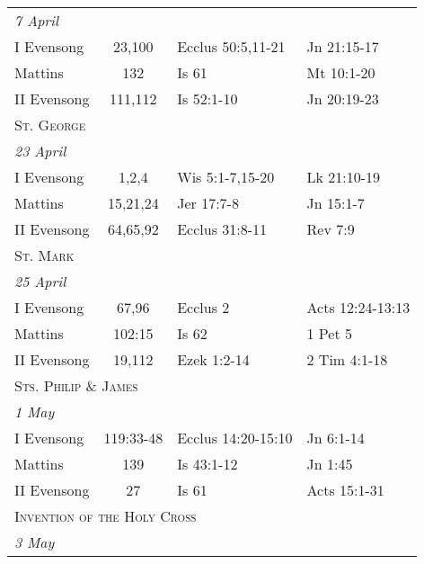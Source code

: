 \begin{longtable}{l c l l}
\multicolumn{4}{l}{\textit{7 April}}\\
\hspace{1em} I Evensong&23,100&Ecclus 50:5,11-21&Jn 21:15-17\\
\hspace{1em} Mattins&132&Is 61&Mt 10:1-20\\
\hspace{1em} II Evensong&111,112&Is 52:1-10&Jn 20:19-23\\
\multicolumn{4}{l}{\textsc{St. George}}\\
\multicolumn{4}{l}{\textit{23 April}}\\
\hspace{1em} I Evensong&1,2,4&Wis 5:1-7,15-20&Lk 21:10-19\\
\hspace{1em} Mattins&15,21,24&Jer 17:7-8&Jn 15:1-7\\
\hspace{1em} II Evensong&64,65,92&Ecclus 31:8-11&Rev 7:9\\
\multicolumn{4}{l}{\textsc{St. Mark}}\\
\multicolumn{4}{l}{\textit{25 April}}\\
\hspace{1em} I Evensong&67,96&Ecclus 2&Acts 12:24-13:13\\
\hspace{1em} Mattins&102:15&Is 62&1 Pet 5\\
\hspace{1em} II Evensong&19,112&Ezek 1:2-14&2 Tim 4:1-18\\
\multicolumn{4}{l}{\textsc{Sts. Philip \& James}}\\
\multicolumn{4}{l}{\textit{1 May}}\\
\hspace{1em} I Evensong&119:33-48&Ecclus 14:20-15:10&Jn 6:1-14\\
\hspace{1em} Mattins&139&Is 43:1-12&Jn 1:45\\
\hspace{1em} II Evensong&27&Is 61&Acts 15:1-31\\
\multicolumn{4}{l}{\textsc{Invention of the Holy Cross}}\\
\multicolumn{4}{l}{\textit{3 May}}\\

\end{longtable}
